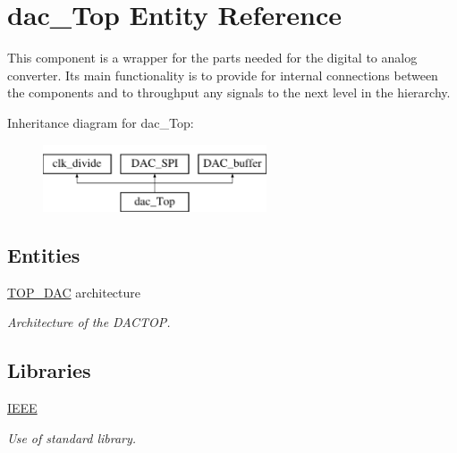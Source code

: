 \hypertarget{classdac__Top}{\section{dac\-\_\-\-Top Entity Reference}
\label{classdac__Top}
}


This component is a wrapper for the parts needed for the digital to analog converter. Its main functionality is to provide for internal connections between the components and to throughput any signals to the next level in the hierarchy.  


Inheritance diagram for dac\-\_\-\-Top\-:\begin{figure}[H]
\begin{center}
\leavevmode
\includegraphics[height=2.000000cm]{classdac__Top}
\end{center}
\end{figure}
\subsection*{Entities}
\begin{DoxyCompactItemize}
\item 
\hyperlink{classdac__Top_1_1TOP__DAC}{T\-O\-P\-\_\-\-D\-A\-C} architecture
\begin{DoxyCompactList}\small\item\em Architecture of the D\-A\-C\-T\-O\-P. \end{DoxyCompactList}\end{DoxyCompactItemize}
\subsection*{Libraries}
 \begin{DoxyCompactItemize}
\item 
\hypertarget{classdac__Top_ae4f03c286607f3181e16b9aa12d0c6d4}{\hyperlink{classdac__Top_ae4f03c286607f3181e16b9aa12d0c6d4}{I\-E\-E\-E} }\label{classdac__Top_ae4f03c286607f3181e16b9aa12d0c6d4}

\begin{DoxyCompactList}\small\item\em Use of standard library. \end{DoxyCompactList}\end{DoxyCompactItemize}
